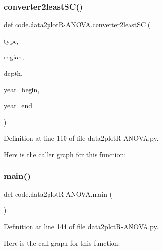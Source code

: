 \subsubsection{\texorpdfstring{converter2least\+S\+C()}{converter2leastSC()}}
{\footnotesize\ttfamily def code.\+data2plotR-\/A\+N\+O\+V\+A.\+converter2least\+SC (\begin{DoxyParamCaption}\item[{}]{type,  }\item[{}]{region,  }\item[{}]{depth,  }\item[{}]{year\+\_\+begin,  }\item[{}]{year\+\_\+end }\end{DoxyParamCaption})}



Definition at line 110 of file data2plot\+R-\/\+A\+N\+O\+V\+A.\+py.

Here is the caller graph for this function\+:
\mbox{\label{namespacecode_1_1data2plot_r-_a_n_o_v_a_a2572fd7384cf554d3dcd85d348638326}} 
\subsubsection{\texorpdfstring{main()}{main()}}
{\footnotesize\ttfamily def code.\+data2plotR-\/A\+N\+O\+V\+A.\+main (\begin{DoxyParamCaption}{ }\end{DoxyParamCaption})}



Definition at line 144 of file data2plot\+R-\/\+A\+N\+O\+V\+A.\+py.

Here is the call graph for this function\+:
